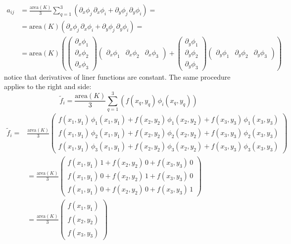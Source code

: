 \documentclass[11pt]{amsart}
\begin{document}
\[
\begin{split}
a_{ij} & = \frac{\mathrm{area}(K)}{3}\sum_{q=1}^3 \left(
\partial_x \phi_j\, \partial_x \phi_i + 
\partial_y \phi_j\, \partial_y \phi_i\right) = \\
& = \mathrm{area}(K)\left(
\partial_x \phi_j\, \partial_x \phi_i + 
\partial_y \phi_j\, \partial_y \phi_i\right) = \\
& = \mathrm{area}(K)\left(\left(
\begin{array}{c}
\partial_x \phi_1\\
\partial_x \phi_2\\
\partial_x \phi_3
\end{array}\right)
\left(
\begin{array}{ccc}
\partial_x \phi_1&
\partial_x \phi_2&
\partial_x \phi_3
\end{array}
\right)+
\left(
\begin{array}{c}
\partial_y \phi_1\\
\partial_y \phi_2\\
\partial_y \phi_3
\end{array}\right)
\left(
\begin{array}{ccc}
\partial_y \phi_1&
\partial_y \phi_2&
\partial_y \phi_3
\end{array}
\right)
\right)
\end{split}
\]
notice that derivatives of liner functions are constant.
The same procedure applies to the right and side:
\[
\tilde f_i = 
\frac{\mathrm{area}(K)}{3}\sum_{q=1}^3 \left(
f(x_q,y_q)\, \phi_i(x_q,y_q)\right)
\]
\[
\begin{split}
\tilde f_i = & 
\frac{\mathrm{area}(K)}{3} \left(
\begin{array}{c}
f(x_1,y_1)\, \phi_1(x_1,y_1) + f(x_2,y_2)\, \phi_1(x_2,y_2) + f(x_3,y_3)\, \phi_1(x_3,y_3)\\
f(x_1,y_1)\, \phi_2(x_1,y_1) + f(x_2,y_2)\, \phi_2(x_2,y_2) + f(x_3,y_3)\, \phi_2(x_3,y_3)\\
f(x_1,y_1)\, \phi_3(x_1,y_1) + f(x_2,y_2)\, \phi_3(x_2,y_2) + f(x_3,y_3)\, \phi_3(x_3,y_3)
\end{array}
\right)\\
&=
\frac{\mathrm{area}(K)}{3} \left(
\begin{array}{c}
f(x_1,y_1)\, 1 + f(x_2,y_2)\, 0 + f(x_3,y_3)\, 0\\
f(x_1,y_1)\, 0 + f(x_2,y_2)\, 1 + f(x_3,y_3)\, 0\\
f(x_1,y_1)\, 0 + f(x_2,y_2)\, 0 + f(x_3,y_3)\, 1
\end{array}
\right)\\
& =
\frac{\mathrm{area}(K)}{3} \left(
\begin{array}{c}
f(x_1,y_1)\\
f(x_2,y_2)\\
f(x_3,y_3)
\end{array}
\right)
\end{split}
\]
\end{document}
